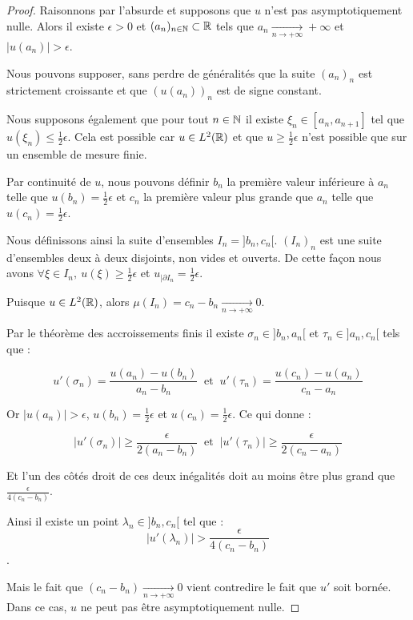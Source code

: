 \begin{proof}

    \vspace{1em}

    Raisonnons par l'absurde et supposons que $u$ n'est pas asymptotiquement nulle.
    Alors il existe $\epsilon > 0$ et $(a_n)_{n \in \mathbb{N}} \subset \mathbb{R}$ tels que $a_n \xrightarrow[n \to +\infty]{} + \infty$ et $|u(a_n)|>\epsilon$.

    Nous pouvons supposer, sans perdre de généralités que la suite $(a_n)_n$ est strictement croissante et que $(u(a_n))_n$ est de signe constant.

    Nous supposons également que pour tout $n \in \mathbb{N}$ il existe $\xi_n \in [a_n,a_{n+1}]$ tel que $u(\xi_n) \leq \frac{1}{2}\epsilon$.
    Cela est possible car $u \in L^2(\mathbb{R})$ et que $u \geq \frac{1}{2}\epsilon$ n'est possible que sur un ensemble de mesure finie.

    \vspace{1em}
    Par continuité de $u$, nous pouvons définir $b_n$ la première valeur inférieure à $a_n$ telle que $u(b_n) = \frac{1}{2}\epsilon$ et
    $c_n$ la première valeur plus grande que $a_n$ telle que $u(c_n) = \frac{1}{2}\epsilon$. 
    
    Nous définissons ainsi la suite d'ensembles $I_n = ]b_n,c_n[$.
    $(I_n)_n$ est une suite d'ensembles deux à deux disjoints, non vides et ouverts. De cette façon nous avons $\forall \xi \in I_n, \ u(\xi) \geq \frac{1}{2}\epsilon$ et $u_{|\partial I_n} = \frac{1}{2}\epsilon$.
    
    Puisque $u \in L^2(\mathbb{R})$, alors $\mu(I_n) = c_n - b_n \xrightarrow[n \to +\infty]{}0$.

    \vspace{1em}
    Par le théorème des accroissements finis il existe $\sigma_n \in ]b_n,a_n[$ et $\tau_n \in ]a_n, c_n[$ tels que :

    $$ u'(\sigma_n) = \frac{u(a_n) - u(b_n)}{a_n - b_n} \ \text{ et } \ u'(\tau_n) = \frac{u(c_n) - u(a_n)}{c_n - a_n} $$

    Or $|u(a_n)|>\epsilon$, $u(b_n) = \frac{1}{2}\epsilon$ et $u(c_n) = \frac{1}{2}\epsilon$.
    Ce qui donne :

    $$|u'(\sigma_n)| \geq \frac{\epsilon}{2(a_n - b_n)} \ \text{ et } \ |u'(\tau_n)| \geq \frac{\epsilon}{2(c_n - a_n)} $$
    
    Et l'un des côtés droit de ces deux inégalités doit au moins être plus grand que $\frac{\epsilon}{4(c_n - b_n)}$.

    Ainsi il existe un point $\lambda_n \in ]b_n,c_n[$ tel que :
    $$|u'(\lambda_n)| > \frac{\epsilon}{4(c_n - b_n)}$$.

    Mais le fait que $(c_n - b_n) \xrightarrow[n \to +\infty]{}0$ vient contredire le fait que $u'$ soit bornée.
    Dans ce cas, $u$ ne peut pas être asymptotiquement nulle.

\end{proof}

